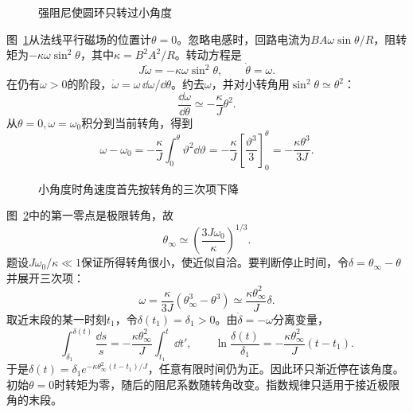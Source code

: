 \begin{figure}[H]\centering
{}
\caption{强阻尼使圆环只转过小角度}\label{fig:i4-h12-q}
\end{figure}
\begin{solution}
图~\ref{fig:i4-h12-q}从法线平行磁场的位置计$\theta=0$。忽略电感时，回路电流为$BA\omega\sin\theta/R$，阻转矩为$-\kappa\omega\sin^2\theta$，其中$\kappa=B^2A^2/R$。转动方程是
\[
J\dot\omega=-\kappa\omega\sin^2\theta,\qquad \dot\theta=\omega.
\]
在仍有$\omega>0$的阶段，$\dot\omega=\omega\,\dd\omega/\dd\theta$。约去$\omega$，并对小转角用$\sin^2\theta\simeq\theta^2$：
\[
\frac{\dd\omega}{\dd\theta}\simeq-\frac{\kappa}{J}\theta^2.
\]
从$\theta=0,\omega=\omega_0$积分到当前转角，得到
\[
\omega-\omega_0=-\frac{\kappa}{J}\int_0^\theta\vartheta^2\dd\vartheta
=-\frac{\kappa}{J}\left[\frac{\vartheta^3}{3}\right]_0^\theta
=-\frac{\kappa\theta^3}{3J}.
\]
\begin{figure}[H]\centering
{}
\caption{小角度时角速度首先按转角的三次项下降}\label{fig:i4-h12-s}
\end{figure}
图~\ref{fig:i4-h12-s}中的第一零点是极限转角，故
\[
\boxed{\theta_\infty\simeq
\left(\frac{3J\omega_0}{\kappa}\right)^{1/3}}.
\]
题设$J\omega_0/\kappa\ll1$保证所得转角很小，使近似自洽。要判断停止时间，令$\delta=\theta_\infty-\theta$并展开三次项：
\[
\omega=\frac{\kappa}{3J}(\theta_\infty^3-\theta^3)
\simeq\frac{\kappa\theta_\infty^2}{J}\delta.
\]
取近末段的某一时刻$t_1$，令$\delta(t_1)=\delta_1>0$。由$\dot\delta=-\omega$分离变量，
\[\int_{\delta_1}^{\delta(t)}\frac{\dd s}s
=-\frac{\kappa\theta_\infty^2}{J}\int_{t_1}^{t}\dd t',\qquad
\ln\frac{\delta(t)}{\delta_1}
=-\frac{\kappa\theta_\infty^2}{J}(t-t_1).\]
于是$\delta(t)=\delta_1e^{-\kappa\theta_\infty^2(t-t_1)/J}$，任意有限时间仍为正。因此环只渐近停在该角度。初始$\theta=0$时转矩为零，随后的阻尼系数随转角改变。指数规律只适用于接近极限角的末段。
\end{solution}

